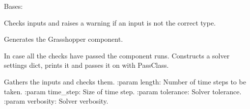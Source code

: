 \documentclass[letterpaper,10pt,english]{sphinxmanual}
\begin{document}

\begin{fulllineitems}
\label{\detokenize{cmf:livestock.components.comp_cmf.CMFSolverSettings}}
Bases: {\hyperref[\detokenize{superclass:livestock.components.component.GHComponent}]{}}

\begin{fulllineitems}
\label{\detokenize{cmf:livestock.components.comp_cmf.CMFSolverSettings.check_inputs}}
Checks inputs and raises a warning if an input is not the correct type.

\end{fulllineitems}


\begin{fulllineitems}
\label{\detokenize{cmf:livestock.components.comp_cmf.CMFSolverSettings.config}}
Generates the Grasshopper component.

\end{fulllineitems}


\begin{fulllineitems}
\label{\detokenize{cmf:livestock.components.comp_cmf.CMFSolverSettings.run}}
In case all the checks have passed the component runs.
Constructs a solver settings dict, prints it and passes it on with PassClass.

\end{fulllineitems}


\begin{fulllineitems}
\label{\detokenize{cmf:livestock.components.comp_cmf.CMFSolverSettings.run_checks}}
Gathers the inputs and checks them.
:param length: Number of time steps to be taken.
:param time\_step: Size of time step.
:param tolerance: Solver tolerance.
:param verbosity: Solver verbosity.

\end{fulllineitems}


\end{fulllineitems}
\end{document}
